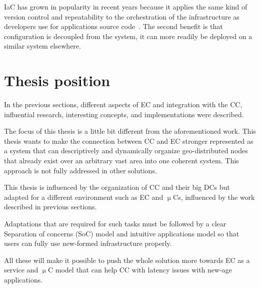 IaC has grown in popularity in recent years because it applies the same kind of version control and repeatability to the orchestration of the infrastructure as developers use for applications source code~\cite{ArtacBNGT17}. The second benefit is that configuration is decoupled from the system, it can more readily be deployed on a similar system elsewhere.
%
%
\section{Thesis position}\label{sec:thesis_position}
%
In the previous sections, different aspects of EC and integration with the CC, influential research, interesting concepts, and implementations were described.

The focus of this thesis is a little bit different from the aforementioned work. This thesis wants to make the connection between CC and EC stronger represented as a system that can descriptively and dynamically organize geo-distributed nodes that already exist over an arbitrary vast area into one coherent system. This approach is not fully addressed in other solutions. 

This thesis is influenced by the organization of CC and their big DCs but adapted for a different environment such as EC and $\upmu$Cs, influenced by the work described in previous sections. 

Adaptations that are required for such tasks must be followed by a clear Separation of concerns (SoC) model and intuitive applications model so that users can fully use new-formed infrastructure properly. 

All these will make it possible to push the whole solution more towards EC as a service and $\upmu$C model that can help CC with latency issues with new-age applications.
%
%